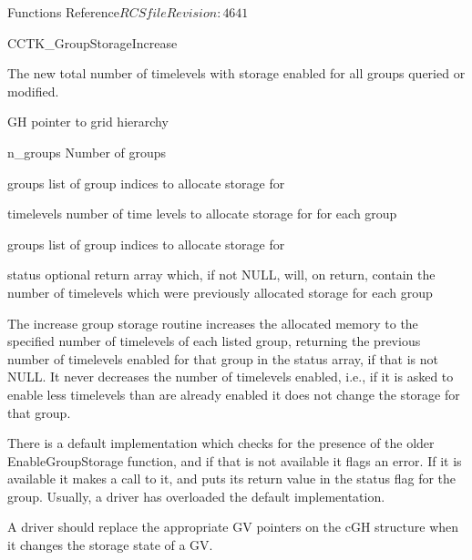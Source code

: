 \begin{cactuspart}{ Functions Reference}{$RCSfile$}{$Revision: 4641 $}
\begin{FunctionDescription}{CCTK\_GroupStorageIncrease}
\begin{ResultSection}
\begin{Result}{}
  The new total number of timelevels with storage enabled for all
  groups queried or modified.
\end{Result}
\end{ResultSection}

\begin{ParameterSection}
\begin{Parameter}{GH}
pointer to grid hierarchy
\end{Parameter}
\begin{Parameter}{n\_groups}
Number of groups
\end{Parameter}
\begin{Parameter}{groups}
list of group indices to allocate storage for
\end{Parameter}
\begin{Parameter}{timelevels}
number of time levels to allocate storage for for each group
\end{Parameter}
\begin{Parameter}{groups}
list of group indices to allocate storage for
\end{Parameter}
\begin{Parameter}{status}
  optional return array which, if not NULL, will, on return, contain
  the number of timelevels which were previously allocated storage for
  each group
\end{Parameter}
\end{ParameterSection}

\begin{Discussion}
  The increase group storage routine increases the allocated memory to
  the specified number of timelevels of each listed group, returning
  the previous number of timelevels enabled for that group in the
  status array, if that is not NULL.  It never decreases the number of
  timelevels enabled, i.e., if it is asked to enable less timelevels
  than are already enabled it does not change the storage for that
  group.

  There is a default implementation which checks for the presence of
  the older EnableGroupStorage function, and if that is not available
  it flags an error.  If it is available it makes a call to it, and
  puts its return value in the status flag for the group.  Usually, a
  driver has overloaded the default implementation.

  A driver should replace the appropriate GV pointers on the cGH
  structure when it changes the storage state of a GV.
\end{Discussion}
\end{FunctionDescription}




\end{cactuspart}
